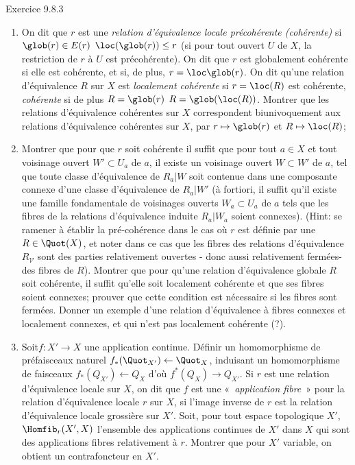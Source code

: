\documentclass[10pt]{../fichiers-configuration-latex/smfart}
\begin{document}
\begin{enonce*}[remark]{Exercice 9.8.3}
\begin{enumerate}
\item On dit que $r$ est une \emph{relation d'équivalence locale
précohérente (\resp cohérente)} si $\glob(r)\in E(r)$ \ie
$\loc(\glob(r))\leq r$ (\resp si pour tout ouvert $U$ de $X$, la
restriction de $r$ à $U$ est précohérente). On dit que $r$ est
globalement cohérente si elle est cohérente, et si, de plus, $r=\loc
\glob(r)$. On dit qu'une relation d'équivalence $R$ sur $X$ est
\emph{localement cohérente} si $r=\loc(R)$ est cohérente,
\emph{cohérente} si de plus $R=\glob(r)$ \ie $R=\glob(\loc(R))$.
Montrer que les relations d'équivalence 
cohérentes  sur $X$ correspondent biunivoquement aux relations
d'équivalence cohérentes  sur $X$, par $r\mapsto \glob(r)$ et
$R\mapsto \loc(R)$;

\item Montrer que pour que $r$ soit cohérente il suffit que pour tout
$a\in X$ et tout voisinage ouvert $W'\subset U_a$ de $a$, il existe
un voisinage ouvert $W\subset W'$ de $a$, tel que toute classe
d'équivalence de $R_a| W$ soit contenue dans une composante connexe
d'une classe d'équivalence de $R_a| W'$ (à fortiori, il suffit qu'il
existe une famille fondamentale de voisinages ouverts $W_a\subset
U_a$ de $a$ tels que les fibres de la relations d'équivalence
induite $R_a| W_a$ soient connexes). (Hint: se ramener à établir la
pré-cohérence dans le cas où $r$ est définie par une $R\in
\Quot(X)$, et noter dans ce cas que les fibres des relations
d'équivalence $R_{𝒱}$ sont des parties relativement ouvertes
- donc aussi relativement fermées- des fibres de $R$). Montrer que
pour qu'une relation d'équivalence globale $R$ soit cohérente, il
suffit qu'elle soit localement cohérente et que ses fibres soient
connexes; prouver que cette condition est nécessaire si les fibres
sont fermées. Donner un exemple d'une relation d'équivalence à
fibres connexes et localement connexes, et qui n'est pas localement
cohérente (?).

\item Soit\pageoriginale $f:X'\rightarrow X$ une application
continue. Définir un homomorphisme de préfaisceaux naturel
$f_{\ast}(\Quot_{X'})\leftarrow \Quot_{X}$, induisant un
homomorphisme de faisceaux $f_{\ast}(Q_{X'})\leftarrow Q_X$ d'où
$f^{\ast}(Q_X)\rightarrow Q_{X'}$. Si $r$ est une relation
d'équivalence locale sur $X$, on dit que $f$ est une « \emph{application fibre} »  pour la relation d'équivalence locale
$r$ sur $X$, si l'image inverse de $r$ est la relation d'équivalence
locale grossière sur $X'$. Soit, pour tout espace topologique $X'$,
$\Homfib_r(X',X)$ l'ensemble des applications continues de $X'$ dans
$X$ qui sont des applications fibres relativement à $r$. Montrer que
pour $X'$ variable, on obtient un contrafoncteur en $X'$.


\end{enumerate}
\end{enonce*}
\end{document}
